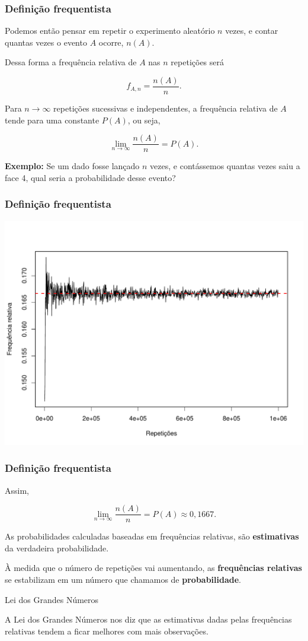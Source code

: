\documentclass[11pt]{beamer}
\begin{document}
\begin{frame}
\frametitle{Definição frequentista}

Podemos então pensar em repetir o experimento aleatório \(n\) vezes, e
contar quantas vezes o evento \(A\) ocorre, \(n(A)\).

Dessa forma a frequência relativa de \(A\) nas \(n\) repetições será

\[
f_{A,n} = \frac{n(A)}{n}.
\]

Para \(n \rightarrow \infty\) repetições sucessivas e independentes, a
frequência relativa de \(A\) tende para uma constante \(P(A)\), ou seja,

\[
\lim_{n \rightarrow \infty} \frac{n(A)}{n} = P(A).
\]

\textbf{Exemplo:} Se um dado fosse lançado \(n\) vezes, e contássemos
quantas vezes saiu a face 4, qual seria a probabilidade desse evento?
\end{frame}

\begin{frame}
\frametitle{Definição frequentista}

\begin{center}\includegraphics[width=0.8\linewidth]{figs/prob_freq} \end{center}
\end{frame}

\begin{frame}
\frametitle{Definição frequentista}

Assim,

\[
\lim_{n \rightarrow \infty} \frac{n(A)}{n} = P(A) \approx 0,1667.
\]

As probabilidades calculadas baseadas em frequências relativas, são
\textbf{estimativas} da verdadeira probabilidade.

À medida que o número de repetições vai aumentando, as
\textbf{frequências relativas} se estabilizam em um número que chamamos
de \textbf{probabilidade}.

\begin{alertblock}{Lei dos Grandes Números}

A Lei dos Grandes Números nos diz que as estimativas dadas pelas
frequências relativas tendem a ficar melhores com mais observações.
\end{alertblock}
\end{frame}
\end{document}
